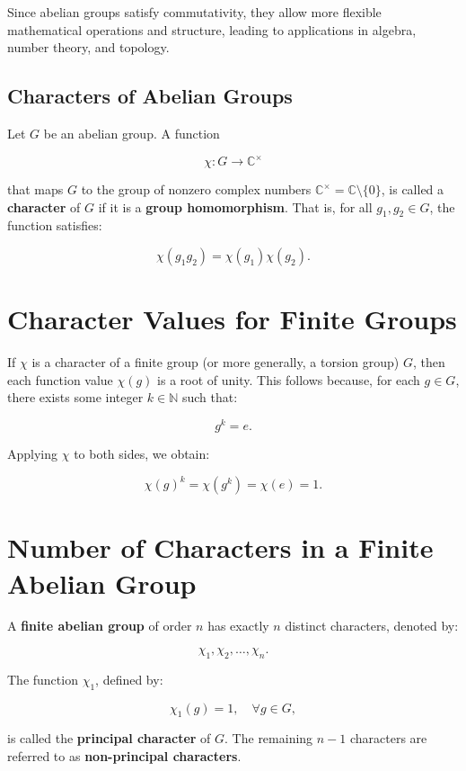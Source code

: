\documentclass[11pt]{article}
\theoremstyle{definition}
\begin{document}
Since abelian groups satisfy commutativity, they allow more flexible mathematical operations and structure, leading to applications in algebra, number theory, and topology.



\subsection{Characters of Abelian Groups}
Let \( G \) be an abelian group. A function  

\[
\chi: G \to \mathbb{C}^{\times}
\]

that maps \( G \) to the group of nonzero complex numbers  \(\mathbb{C}^{\times} = \mathbb{C} \setminus \{0\}\), is called a \textbf{character} of \( G \) if it is a \textbf{group homomorphism}. That is, for all \( g_1, g_2 \in G \), the function satisfies:  

\[
\chi(g_1 g_2) = \chi(g_1) \chi(g_2).
\]

\section*{Character Values for Finite Groups}

If \( \chi \) is a character of a finite group (or more generally, a torsion group) \( G \), then each function value \( \chi(g) \) is a root of unity. This follows because, for each \( g \in G \), there exists some integer \( k \in \mathbb{N} \) such that:  

\[
g^k = e.
\]

Applying \( \chi \) to both sides, we obtain:  

\[
\chi(g)^k = \chi(g^k) = \chi(e) = 1.
\]

\section*{Number of Characters in a Finite Abelian Group}

A \textbf{finite abelian group} of order \( n \) has exactly \( n \) distinct characters, denoted by:  

\[
\chi_1, \chi_2, \dots, \chi_n.
\]

The function \( \chi_1 \), defined by:  

\[
\chi_1(g) = 1, \quad \forall g \in G,
\]

is called the \textbf{principal character} of \( G \). The remaining \( n-1 \) characters are referred to as \textbf{non-principal characters}.
\end{document}
